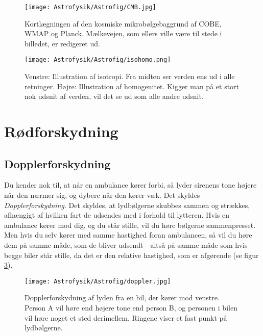 \begin{figure}[h]
	\centering
	\texttt{[image: Astrofysik/Astrofig/CMB.jpg]}
	\caption{Kortlægningen af den kosmiske mikrobølgebaggrund af COBE, WMAP og
		Planck. Mælkevejen, som ellers ville være til stede i billedet, er redigeret ud. }
	\label{CMB}
\end{figure}

\begin{figure}[h]
	\centering
	\texttt{[image: Astrofysik/Astrofig/isohomo.png]}
	\caption{Venstre: Illustration af isotropi. Fra midten ser verden ens ud i alle retninger. Højre: Illustration af homogenitet. Kigger man på et stort nok udsnit af verden, vil det se ud som alle andre udsnit.}
	\label{isohomo}
\end{figure}

\section{Rødforskydning}
\label{12}
\subsection{Dopplerforskydning}
Du kender nok til, at når en ambulance kører forbi, så lyder sirenens tone højere når den nærmer sig, og dybere når den kører væk. Det skyldes \emph{Dopplerforskydning}. %
Det skyldes, at lydbølgerne skubbes sammen og strækkes, afhængigt af hvilken fart de udsendes med i forhold til lytteren. Hvis en ambulance kører mod dig, og du står stille, vil du høre bølgerne sammenpresset. Men hvis du selv kører med samme hastighed foran ambulancen, så vil du høre dem på samme måde, som de bliver udsendt - altså på samme måde som hvis begge biler står stille, da det er den relative hastighed, som er afgørende (se figur \ref{doppler}).

\begin{figure}[h!]
	\centering
	\texttt{[image: Astrofysik/Astrofig/doppler.jpg]}
	\caption{Dopplerforskydning af lyden fra en bil, der kører mod venstre. Person A vil høre end højere tone end person B, og personen i bilen vil høre noget et sted derimellem. Ringene viser et fast punkt på lydbølgerne.}
	\label{doppler}
\end{figure}


